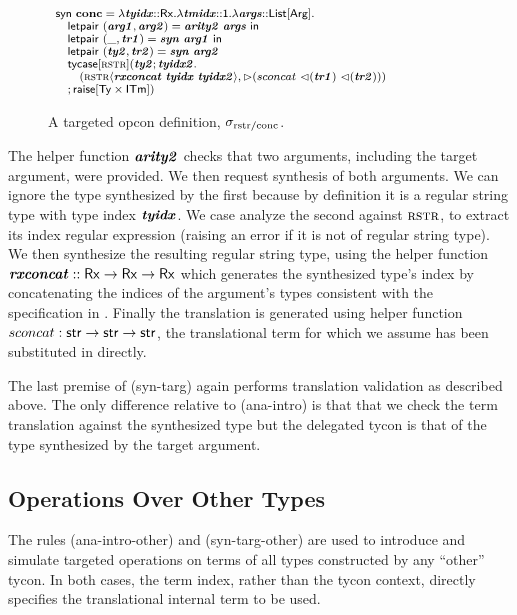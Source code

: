 \documentclass[preprint]{sigplanconf}
\begin{document}
\begin{figure}[t]
$\small\begin{array}{l}
\keyw{syn}~\opname{conc}=\slam{\krx}{\svar{tyidx}}{
    \slam{\kunit}{\svar{tmidx}}{
        \slam{\kargs}{\svar{args}}{\\
            \quad \keyw{letpair}~(\svar{arg1}, \svar{arg2}) = \svar{arity2}~\svar{args}~\keyw{in}\\
            \quad \keyw{letpair}~(\_, \svar{tr1}) = \svar{syn}~\svar{arg1}~\keyw{in}~  \\\quad\keyw{letpair}~(\svar{ty2}, \svar{tr2}) = \svar{syn}~\svar{arg2}\\
            \quad \stycase{\tcvar{rstr}}{\svar{ty2}}{\svar{tyidx2}}{\\
                \quad\quad (\sty{\tcvar{rstr}}{\svar{rxconcat}~\svar{tyidx}~\svar{tyidx2}}, \sqitm{sconcat~\quq{\svar{tr1}}~\quq{\svar{tr2}}})\\
                \quad
            }{\sraise{\kty\times\kitm}}
        }
    }
}
\end{array}
$
\caption{A targeted opcon definition, $\sigma_\text{rstr/conc}$.}
\label{fig:example-conc}
\vspace{-8px}
\end{figure}
The helper function ${\textbf{\textit{arity2}}}$ checks that two arguments, including the target argument, were provided. We then request synthesis of both arguments. We can ignore the type synthesized by the first because by definition it is a regular string type with type index ${\textbf{\textit{tyidx}}}$. We case analyze the second against $\textsc{rstr}$, to extract its index regular expression (raising an error if it is not of regular string type). We then synthesize the resulting regular string type, using the helper function ${\textbf{\textit{rxconcat}}} :: {\sf Rx} \rightarrow {\sf Rx} \rightarrow {\sf Rx}$ which generates the synthesized type's  index by concatenating the indices of the argument's types consistent with the specification in \cite{sanitation-psp14}. Finally the translation is generated using helper function $sconcat : {\sf str} \rightarrow {\sf str} \rightarrow {\sf str}$, the translational term for which we assume has been substituted in directly.

The last premise of (syn-targ) again performs translation validation as described above. The only difference relative to (ana-intro) is that that we check the term translation against the synthesized type but the delegated tycon is that of the type synthesized by the target argument.

\subsection{Operations Over Other Types}
\noindent
The rules (ana-intro-other) and (syn-targ-other) are used to introduce and simulate targeted operations on terms of all types constructed by any ``other'' tycon. In both cases, the term index, rather than the tycon context, directly specifies the translational internal term to be used. %
\end{document}
